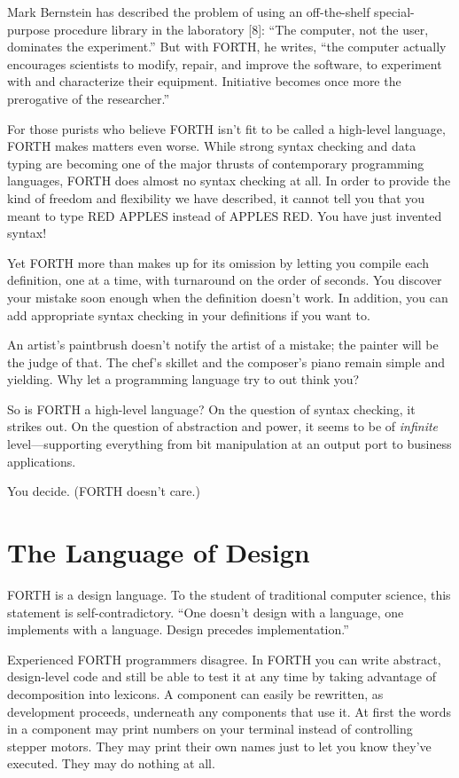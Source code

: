 Mark Bernstein has described the problem of using an off-the-shelf
special-purpose procedure library in the laboratory {[}8{]}: {}``The
computer, not the user, dominates the experiment.'' But with FORTH,
he writes, {}``the computer actually encourages scientists to modify,
repair, and improve the software, to experiment with and characterize
their equipment. Initiative becomes once more the prerogative of the
researcher.''


For those purists who believe FORTH isn't fit to be called a high-level
language, FORTH makes matters even worse. While strong syntax checking
and data typing are becoming one of the major thrusts of contemporary
programming languages, FORTH does almost no syntax checking at all.
In order to provide the kind of freedom and flexibility we have described,
it cannot tell you that you meant to type RED APPLES instead of APPLES
RED. You have just invented syntax!

Yet FORTH more than makes up for its omission by letting you compile
each definition, one at a time, with turnaround on the order of seconds.
You discover your mistake soon enough when the definition doesn't
work. In addition, you can add appropriate syntax checking in your
definitions if you want to.

An artist's paintbrush doesn't notify the artist of a mistake; the
painter will be the judge of that. The chef's skillet and the composer's
piano remain simple and yielding. Why let a programming language try
to out think you?

So is FORTH a high-level language? On the question of syntax checking,
it strikes out. On the question of abstraction and power, it seems
to be of \emph{infinite} level---supporting everything from bit manipulation
at an output port to business applications.

You decide. (FORTH doesn't care.)


\section{The Language of Design}
FORTH is a design language. To the student of traditional computer
science, this statement is self-contradictory. {}``One doesn't design
with a language, one implements with a language. Design precedes implementation.''

Experienced FORTH programmers disagree. In FORTH you can write abstract,
design-level code and still be able to test it at any time by taking
advantage of decomposition into lexicons. A component can easily be
rewritten, as development proceeds, underneath any components that
use it. At first the words in a component may print numbers on your
terminal instead of controlling stepper motors. They may print their
own names just to let you know they've executed. They may do nothing
at all.

